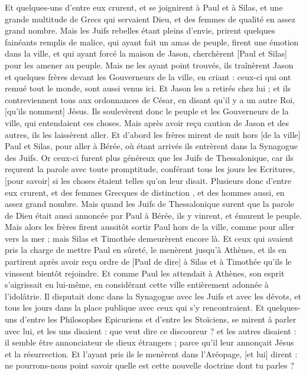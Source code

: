 \begin{multicols}{2}
Et quelques-uns d'entre eux crurent, et se joignirent à Paul et à Silas, et une grande multitude de Grecs qui servaient Dieu, et des femmes de qualité en assez grand nombre.
Mais les Juifs rebelles étant pleins d'envie, prirent quelques fainéants remplis de malice, qui ayant fait un amas de peuple, firent une émotion dans la ville, et qui ayant forcé la maison de Jason, cherchèrent [Paul et Silas] pour les amener au peuple.
Mais ne les ayant point trouvés, ils traînèrent Jason et quelques frères devant les Gouverneurs de la ville, en criant : ceux-ci qui ont remué tout le monde, sont aussi venus ici.
Et Jason les a retirés chez lui ; et ils contreviennent tous aux ordonnances de César, en disant qu'il y a un autre Roi, [qu'ils nomment] Jésus.
Ils soulevèrent donc le peuple et les Gouverneurs de la ville, qui entendaient ces choses.
Mais après avoir reçu caution de Jason et des autres, ils les laissèrent aller.
Et d'abord les frères mirent de nuit hors [de la ville] Paul et Silas, pour aller à Bérée, où étant arrivés ils entrèrent dans la Synagogue des Juifs.
Or ceux-ci furent plus généreux que les Juifs de Thessalonique, car ils reçurent la parole avec toute promptitude, conférant tous les jours les Ecritures, [pour savoir] si les choses étaient telles qu'on leur disait.
Plusieurs donc d'entre eux crurent, et des femmes Grecques de distinction , et des hommes aussi, en assez grand nombre.
Mais quand les Juifs de Thessalonique surent que la parole de Dieu était aussi annoncée par Paul à Bérée, ils y vinrent, et émurent le peuple.
Mais alors les frères firent aussitôt sortir Paul hors de la ville, comme pour aller vers la mer ; mais Silas et Timothée demeurèrent encore là.
Et ceux qui avaient pris la charge de mettre Paul en sûreté, le menèrent jusqu'à Athènes, et ils en partirent après avoir reçu ordre de [Paul de dire] à Silas et à Timothée qu'ils le vinssent bientôt rejoindre.
Et comme Paul les attendait à Athènes, son esprit s'aigrissait en lui-même, en considérant cette ville entièrement adonnée à l'idolâtrie.
Il disputait donc dans la Synagogue avec les Juifs et avec les dévots, et tous les jours dans la place publique avec ceux qui s'y rencontraient.
Et quelques-uns d'entre les Philosophes Epicuriens et d'entre les Stoïciens, se mirent à parler avec lui, et les uns disaient : que veut dire ce discoureur ? et les autres disaient : il semble être annonciateur de dieux étrangers ; parce qu'il leur annonçait Jésus et la résurrection.
Et l'ayant pris ils le menèrent dans l'Aréopage, [et lui] dirent : ne pourrons-nous point savoir quelle est cette nouvelle doctrine dont tu parles ?

\end{multicols}

